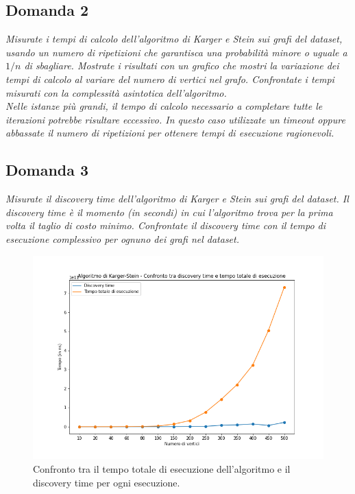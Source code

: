 \subsection{Domanda 2}
\textit{Misurate i tempi di calcolo dell'algoritmo di Karger e Stein sui grafi del dataset, usando un numero di ripetizioni che garantisca una probabilità minore o uguale a $1/n$ di sbagliare. Mostrate i risultati con un grafico che mostri la variazione dei tempi di calcolo al variare del numero di vertici nel grafo. Confrontate i tempi misurati con la complessità asintotica dell'algoritmo. \\
Nelle istanze più grandi, il tempo di calcolo necessario a completare tutte le iterazioni potrebbe risultare eccessivo. In questo caso utilizzate un timeout oppure abbassate il numero di ripetizioni per ottenere tempi di esecuzione ragionevoli.}

\subsection{Domanda 3}
\textit{Misurate il discovery time dell'algoritmo di Karger e Stein sui grafi del dataset. Il discovery time è il momento (in secondi) in cui l'algoritmo trova per la prima volta il taglio di costo minimo.  Confrontate il discovery time con il tempo di esecuzione complessivo per ognuno dei grafi nel dataset.}

\begin{figure}[H]
	\centering
	\includegraphics[width=1\textwidth]{res/images/single/karger-stein/discovery-time/karger_stein_confronto_discovery_time_total_time.png}
	\caption{Confronto tra il tempo totale di esecuzione dell'algoritmo e il discovery time per ogni esecuzione.}
	\label{fig:karger_stein_confronto_discovery_time_total_time}
\end{figure}

